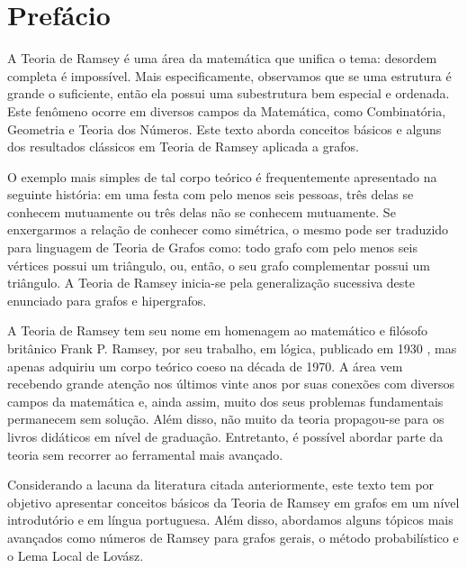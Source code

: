 
\chapter{Prefácio}

A Teoria de Ramsey é uma área da matemática que unifica o tema: desordem completa é impossível. Mais especificamente, observamos que se uma estrutura é grande o suficiente, então ela possui uma subestrutura bem especial e ordenada. Este fenômeno ocorre em diversos campos da Matemática, como Combinatória, Geometria e Teoria dos Números. Este texto aborda conceitos básicos e alguns dos resultados clássicos em Teoria de Ramsey aplicada a grafos.

O exemplo mais simples de tal corpo teórico é frequentemente apresentado na seguinte história: em uma festa com pelo menos seis pessoas, três delas se conhecem mutuamente ou três delas não se conhecem mutuamente. Se enxergarmos a relação de conhecer como simétrica, o mesmo pode ser traduzido para linguagem de Teoria de Grafos como: todo grafo com pelo menos seis vértices possui um triângulo, ou, então, o seu grafo complementar possui um triângulo. A Teoria de Ramsey inicia-se pela generalização sucessiva deste enunciado para grafos e hipergrafos.

A Teoria de Ramsey tem seu nome em homenagem ao matemático e filósofo britânico Frank P. Ramsey, por seu trabalho, em lógica, publicado em 1930 \cite{ramsey}, mas apenas adquiriu um corpo teórico coeso na década de 1970. A área vem recebendo grande atenção nos últimos vinte anos por suas conexões com diversos campos da matemática e, ainda assim, muito dos seus problemas fundamentais permanecem sem solução. Além disso, não muito da teoria propagou-se para os livros didáticos em nível de graduação. Entretanto, é possível abordar parte da teoria sem recorrer ao ferramental mais avançado.

Considerando a lacuna da literatura citada anteriormente, este texto tem por objetivo apresentar conceitos básicos da Teoria de Ramsey em grafos em um nível introdutório e em língua portuguesa. Além disso, abordamos alguns tópicos mais avançados como números de Ramsey para grafos gerais, o método probabilístico e o Lema Local de Lovász.

